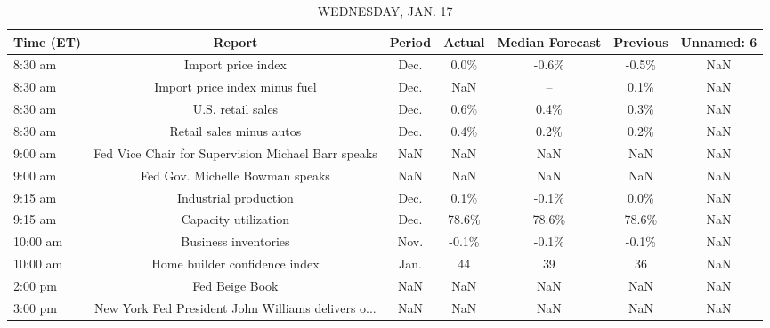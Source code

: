 \documentclass{article}%
\begin{document}
\begin{table}[htbp]%
\caption{WEDNESDAY, JAN. 17}%
\centering%
\begin{adjustbox}{width=1\textwidth}%
\begin{tabular}{lcccccc}
\toprule
Time (ET) &                                             Report & Period & Actual & Median Forecast & Previous & Unnamed: 6 \\
\midrule
  8:30 am &                                 Import price index &   Dec. &   0.0\% &           -0.6\% &    -0.5\% &        NaN \\
  8:30 am &                      Import price index minus fuel &   Dec. &    NaN &              -- &     0.1\% &        NaN \\
  8:30 am &                                  U.S. retail sales &   Dec. &   0.6\% &            0.4\% &     0.3\% &        NaN \\
  8:30 am &                           Retail sales minus autos &   Dec. &   0.4\% &            0.2\% &     0.2\% &        NaN \\
  9:00 am & Fed Vice Chair for Supervision Michael Barr speaks &    NaN &    NaN &             NaN &      NaN &        NaN \\
  9:00 am &                    Fed Gov. Michelle Bowman speaks &    NaN &    NaN &             NaN &      NaN &        NaN \\
  9:15 am &                              Industrial production &   Dec. &   0.1\% &           -0.1\% &     0.0\% &        NaN \\
  9:15 am &                               Capacity utilization &   Dec. &  78.6\% &           78.6\% &    78.6\% &        NaN \\
 10:00 am &                               Business inventories &   Nov. &  -0.1\% &           -0.1\% &    -0.1\% &        NaN \\
 10:00 am &                      Home builder confidence index &   Jan. &     44 &              39 &       36 &        NaN \\
  2:00 pm &                                     Fed Beige Book &    NaN &    NaN &             NaN &      NaN &        NaN \\
  3:00 pm & New York Fed President John Williams delivers o... &    NaN &    NaN &             NaN &      NaN &        NaN \\
\bottomrule
\end{tabular}
%
\end{adjustbox}%
\end{table}
\end{document}
